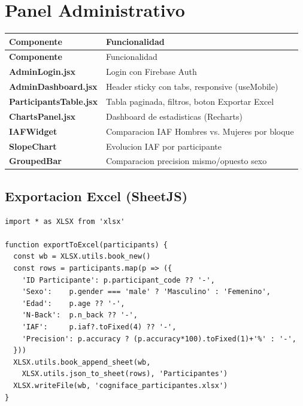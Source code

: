 \documentclass[12pt,a4paper]{article}
\begin{document}
\section{Panel Administrativo}

\begin{longtable}{>{\bfseries}p{4cm} p{9cm}}
\toprule
Componente & Funcionalidad \\
\midrule
\endfirsthead
\toprule
Componente & Funcionalidad \\
\midrule
\endhead
\bottomrule
\endfoot
AdminLogin.jsx       & Login con Firebase Auth \\
AdminDashboard.jsx   & Header sticky con tabs, responsive (useMobile) \\
ParticipantsTable.jsx & Tabla paginada, filtros, boton Exportar Excel \\
ChartsPanel.jsx      & Dashboard de estadisticas (Recharts) \\
IAFWidget            & Comparacion IAF Hombres vs. Mujeres por bloque \\
SlopeChart           & Evolucion IAF por participante \\
GroupedBar           & Comparacion precision mismo/opuesto sexo \\
\end{longtable}

\subsection{Exportacion Excel (SheetJS)}

\begin{lstlisting}[caption={Funcion exportToExcel en ParticipantsTable.jsx}]
import * as XLSX from 'xlsx'

function exportToExcel(participants) {
  const wb = XLSX.utils.book_new()
  const rows = participants.map(p => ({
    'ID Participante': p.participant_code ?? '-',
    'Sexo':    p.gender === 'male' ? 'Masculino' : 'Femenino',
    'Edad':    p.age ?? '-',
    'N-Back':  p.n_back ?? '-',
    'IAF':     p.iaf?.toFixed(4) ?? '-',
    'Precision': p.accuracy ? (p.accuracy*100).toFixed(1)+'%' : '-',
  }))
  XLSX.utils.book_append_sheet(wb,
    XLSX.utils.json_to_sheet(rows), 'Participantes')
  XLSX.writeFile(wb, 'cogniface_participantes.xlsx')
}
\end{lstlisting}

\end{document}
